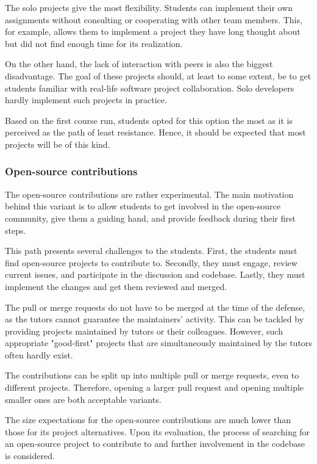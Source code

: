 \documentclass[
  digital,
  color,
  oneside,
  nosansbold,
  nocolorbold,
  nolof,
  nolot,
]{fithesis4}
\begin{document}
The solo projects give the most flexibility. Students can implement their own assignments without consulting or cooperating with other team members. This, for example, allows them to implement a project they have long thought about but did not find enough time for its realization.

On the other hand, the lack of interaction with peers is also the biggest disadvantage. The goal of these projects should, at least to some extent, be to get students familiar with real-life software project collaboration. Solo developers hardly implement such projects in practice.

Based on the first course run, students opted for this option the most as it is perceived as the path of least resistance. Hence, it should be expected that most projects will be of this kind.

\subsubsection{Open-source contributions}

The open-source contributions are rather experimental. The main motivation behind this variant is to allow students to get involved in the open-source community, give them a guiding hand, and provide feedback during their first steps. 

This path presents several challenges to the students. First, the students must find open-source projects to contribute to. Secondly, they must engage, review current issues, and participate in the discussion and codebase. Lastly, they must implement the changes and get them reviewed and merged.

The pull or merge requests do not have to be merged at the time of the defense, as the tutors cannot guarantee the maintainers' activity. This can be tackled by providing projects maintained by tutors or their colleagues. However, such appropriate "good-first" projects that are simultaneously maintained by the tutors often hardly exist.

The contributions can be split up into multiple pull or merge requests, even to different projects. Therefore, opening a larger pull request and opening multiple smaller ones are both acceptable variants.

The size expectations for the open-source contributions are much lower than those for its project alternatives. Upon its evaluation, the process of searching for an open-source project to contribute to and further involvement in the codebase is considered.
\end{document}
